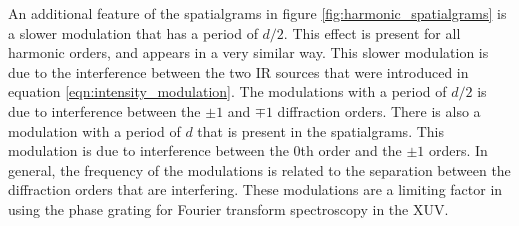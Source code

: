 An additional feature of the spatialgrams in figure \ref{fig:harmonic_spatialgrams} is a slower modulation that has a period of $d/2$.  This effect is present for all harmonic orders, and appears in a very similar way.  This slower modulation is due to the interference between the two IR sources that were introduced in equation \ref{eqn:intensity_modulation}.  The modulations with a period of $d/2$ is due to interference between the $\pm1$ and $\mp1$ diffraction orders.  There is also a modulation with a period of $d$ that is present in the spatialgrams.  This modulation is due to interference between the 0th order and the $\pm1$ orders.  In general, the frequency of the modulations is related to the separation between the diffraction orders that are interfering.  These modulations are a limiting factor in using the phase grating for Fourier transform spectroscopy in the XUV.

